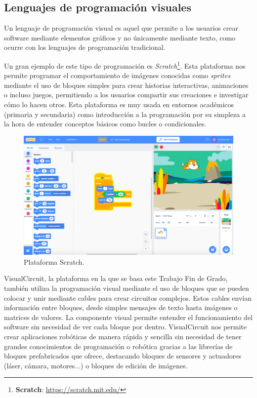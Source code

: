 \subsection{Lenguajes de programación visuales}
\label{subsec:vis_prog}

Un lenguaje de programación visual es aquel que permite a los usuarios crear software mediante elementos gráficos y no únicamente mediante texto,
como ocurre con los lenguajes de programación tradicional.

Un gran ejemplo de este tipo de programación es \textit{Scratch}\footnote{\textbf{Scratch}: \url{https://scratch.mit.edu/}}.
Esta plataforma nos permite programar el comportamiento de imágenes conocidas como \textit{sprites} mediante el uso de bloques simples para crear
historias interactivas, animaciones o incluso juegos, permitiendo a los usuarios compartir sus creaciones e investigar cómo lo hacen otros.
Esta plataforma es muy usada en entornos académicos (primaria y secundaria) como introducción a la programación por su simpleza a la hora de entender
conceptos básicos como bucles o condicionales. 

\begin{figure} [H]
  \begin{center}
    \includegraphics[width=12cm]{figs/c1/scratch.png}
  \end{center}
  \caption[Scratch]{Plataforma Scratch.}
  \label{fig:scratch}
\end{figure}

VisualCircuit, la plataforma en la que se basa este Trabajo Fin de Grado, también utiliza la programación visual mediante el uso de bloques que se
pueden colocar y unir mediante cables para crear circuitos complejos.
Estos cables envían información entre bloques, desde simples mensajes de texto hasta imágenes o matrices de valores.
La componente visual permite entender el funcionamiento del software sin necesidad de ver cada bloque por dentro.
VisualCircuit nos permite crear aplicaciones robóticas de manera rápida y sencilla sin necesidad de tener grandes conocimientos de programación
o robótica gracias a las librerías de bloques prefabricados que ofrece, destacando bloques de sensores y actuadores (láser, cámara, motores...) o bloques
de edición de imágenes.

